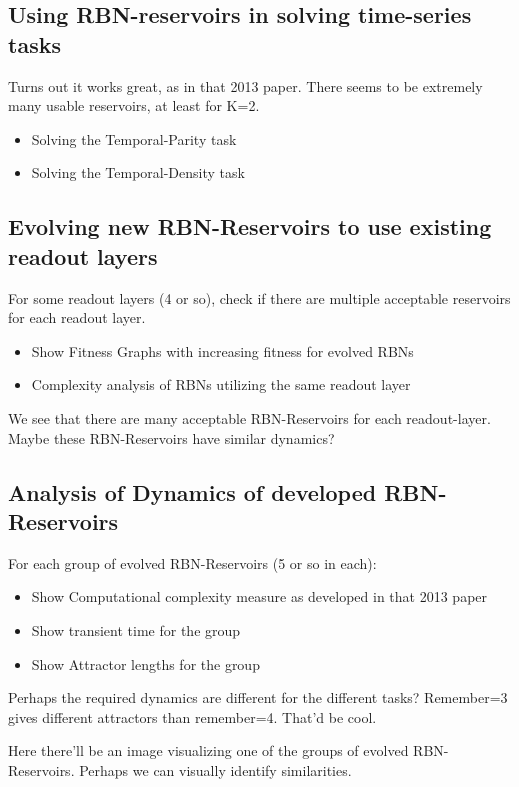 \subsection{Using RBN-reservoirs in solving time-series tasks}

Turns out it works great, as in that 2013 paper.
There seems to be extremely many usable reservoirs, at least for K=2.

\begin{itemize}
  \item Solving the Temporal-Parity task
  \item Solving the Temporal-Density task
\end{itemize}

\subsection{Evolving new RBN-Reservoirs to use existing readout layers}

For some readout layers (4 or so), check if there are multiple acceptable reservoirs for each readout layer.

\begin{itemize}
  \item Show Fitness Graphs with increasing fitness for evolved RBNs
  \item Complexity analysis of RBNs utilizing the same readout layer
\end{itemize}

We see that there are many acceptable RBN-Reservoirs for each readout-layer.
Maybe these RBN-Reservoirs have similar dynamics?


\subsection{Analysis of Dynamics of developed RBN-Reservoirs}

For each group of evolved RBN-Reservoirs (5 or so in each):

\begin{itemize}
  \item Show Computational complexity measure as developed in that 2013 paper
  \item Show transient time for the group
  \item Show Attractor lengths for the group
\end{itemize}


Perhaps the required dynamics are different for the different tasks?
Remember=3 gives different attractors than remember=4. That'd be cool.


Here there'll be an image visualizing one of the groups of evolved RBN-Reservoirs.
Perhaps we can visually identify similarities.
